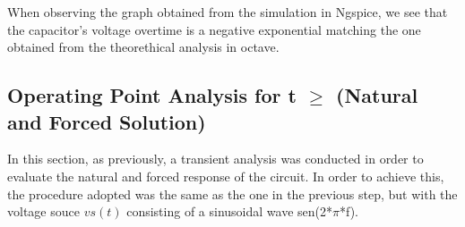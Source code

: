  When observing the graph obtained from the simulation in Ngspice, we see that the capacitor's voltage overtime is a negative exponential matching the one obtained from the theorethical analysis in octave.
 
\pagebreak
 
\subsection{Operating Point Analysis for t $\geq$ (Natural and Forced Solution)}
In this section, as previously, a transient analysis was conducted in order to evaluate the natural and forced response of the circuit. In order to achieve this, the procedure adopted was the same as the one in the previous step, but with the voltage souce $vs(t)$ consisting of a sinusoidal wave sen(2*$\pi$*f).  

